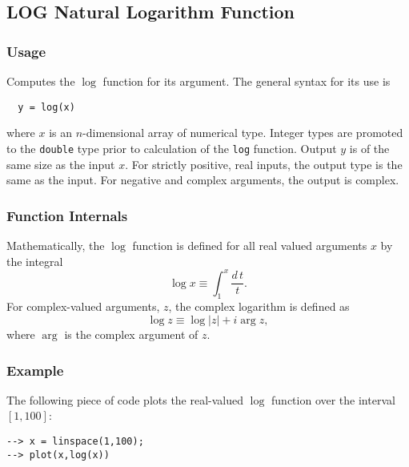 %
%
%
\subsection{LOG Natural Logarithm Function}
\subsubsection{Usage}
Computes the $\log$ function for its argument.  The general
syntax for its use is
\begin{verbatim}
  y = log(x)
\end{verbatim}
where $x$ is an $n$-dimensional array of numerical type.
Integer types are promoted to the \verb|double| type prior to
calculation of the \verb|log| function.  Output $y$ is of the
same size as the input $x$. For strictly positive, real inputs, 
the output type is the same as the input.
For negative and complex arguments, the output is complex.
\subsubsection{Function Internals}
Mathematically, the $\log$ function is defined for all real
valued arguments $x$ by the integral
\[
  \log x \equiv \int_1^{x} \frac{d\,t}{t}.
\]
For complex-valued arguments, $z$, the complex logarithm is
defined as
\[
  \log z \equiv \log |z| + i \arg z,
\]
where $\arg$ is the complex argument of $z$.
\subsubsection{Example}
The following piece of code plots the real-valued $\log$
function over the interval $[1,100]$:
\begin{verbatim}
--> x = linspace(1,100);
--> plot(x,log(x))
\end{verbatim}
